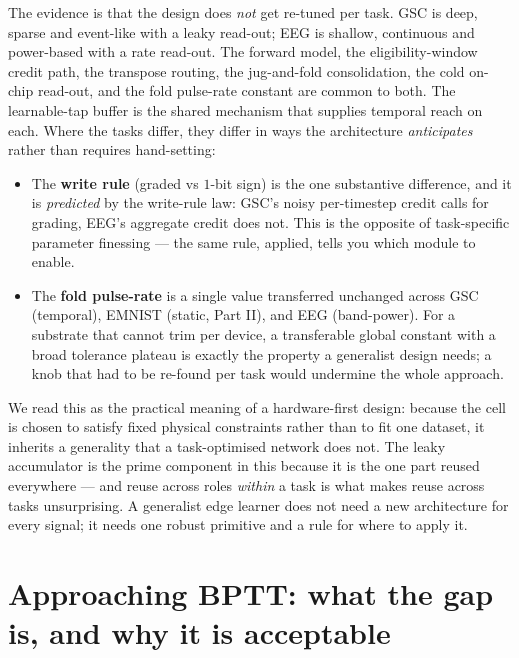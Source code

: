 \documentclass[11pt]{article}
\providecommand{\tightlist}{\setlength{\itemsep}{0pt}\setlength{\parskip}{0pt}}
\begin{document}
The evidence is that the design does \emph{not} get re-tuned per task.
GSC is deep, sparse and event-like with a leaky read-out; EEG is
shallow, continuous and power-based with a rate read-out. The forward
model, the eligibility-window credit path, the transpose routing, the
jug-and-fold consolidation, the cold on-chip read-out, and the fold
pulse-rate constant are common to both. The learnable-tap buffer is the
shared mechanism that supplies temporal reach on each. Where the tasks
differ, they differ in ways the architecture \emph{anticipates} rather
than requires hand-setting:

\begin{itemize}
\tightlist
\item
  The \textbf{write rule} (graded vs \(1\)-bit sign) is the one
  substantive difference, and it is \emph{predicted} by the write-rule
  law: GSC's noisy per-timestep credit calls for grading, EEG's
  aggregate credit does not. This is the opposite of task-specific
  parameter finessing --- the same rule, applied, tells you which module
  to enable.
\item
  The \textbf{fold pulse-rate} is a single value transferred unchanged
  across GSC (temporal), EMNIST (static, Part II), and EEG (band-power).
  For a substrate that cannot trim per device, a transferable global
  constant with a broad tolerance plateau is exactly the property a
  generalist design needs; a knob that had to be re-found per task would
  undermine the whole approach.
\end{itemize}

We read this as the practical meaning of a hardware-first design:
because the cell is chosen to satisfy fixed physical constraints rather
than to fit one dataset, it inherits a generality that a task-optimised
network does not. The leaky accumulator is the prime component in this
because it is the one part reused everywhere --- and reuse across roles
\emph{within} a task is what makes reuse across tasks unsurprising. A
generalist edge learner does not need a new architecture for every
signal; it needs one robust primitive and a rule for where to apply it.

\hypertarget{sec:gap}{%
\section{Approaching BPTT: what the gap is, and why it is
acceptable}\label{sec:gap}}
\end{document}
